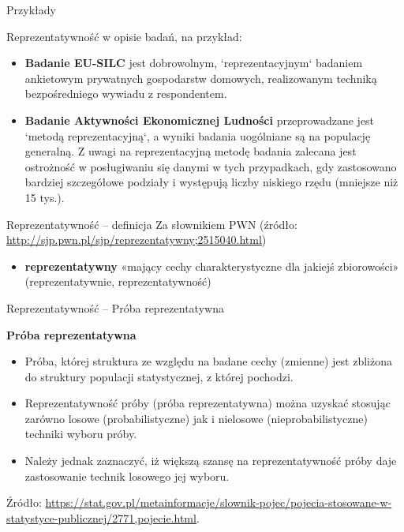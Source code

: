 \documentclass[10pt,ignorenonframetext, aspectratio=169]{beamer}
\begin{document}
\begin{frame}{Przykłady}

Reprezentatywność w opisie badań, na przykład:

\begin{itemize}
    \justifying
    \item \textbf{Badanie EU-SILC} jest dobrowolnym, `reprezentacyjnym` badaniem ankietowym prywatnych gospodarstw domowych, realizowanym techniką bezpośredniego wywiadu z respondentem.
    \item \textbf{Badanie Aktywności Ekonomicznej Ludności} przeprowadzane jest `metodą reprezentacyjną`, a wyniki badania uogólniane są na populację generalną. Z uwagi na reprezentacyjną metodę badania zalecana jest ostrożność w posługiwaniu się danymi w tych przypadkach, gdy zastosowano bardziej szczegółowe podziały i występują liczby niskiego rzędu (mniejsze niż 15 tys.). 
\end{itemize}
\end{frame}


\begin{frame}{Reprezentatywność -- definicja}
Za słownikiem PWN (źródło: \url{http://sjp.pwn.pl/sjp/reprezentatywny;2515040.html})

\begin{itemize}
    \item \textbf{reprezentatywny} «mający cechy charakterystyczne dla jakiejś zbiorowości» (reprezentatywnie, reprezentatywność)
\end{itemize}


\end{frame}

\begin{frame}{Reprezentatywność -- Próba reprezentatywna}

\textbf{Próba reprezentatywna}

\begin{itemize}
    \item Próba, której struktura ze względu na badane cechy (zmienne) jest zbliżona do struktury populacji statystycznej, z której pochodzi. 
    \item Reprezentatywność próby (próba reprezentatywna) można uzyskać stosując zarówno losowe (probabilistyczne) jak i nielosowe (nieprobabilistyczne) techniki wyboru próby. 
    \item Należy jednak zaznaczyć, iż większą szansę na reprezentatywność próby daje zastosowanie technik losowego jej wyboru.
\end{itemize}

\vspace{0.5cm}

Źródło: \url{https://stat.gov.pl/metainformacje/slownik-pojec/pojecia-stosowane-w-statystyce-publicznej/2771,pojecie.html}.
\end{frame}
\end{document}
